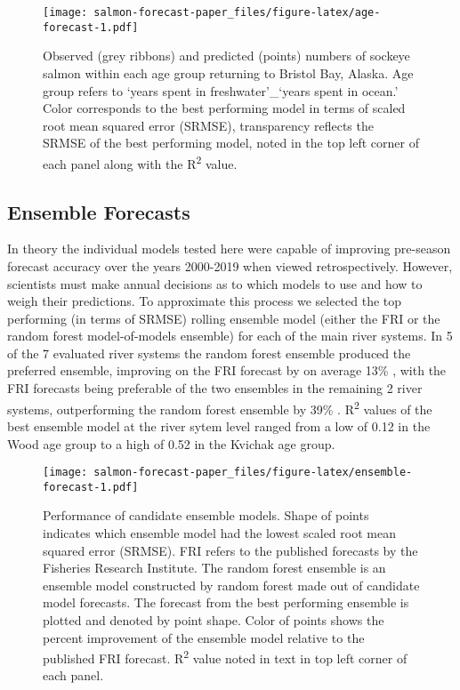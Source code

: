 \documentclass[
]{article}
\begin{document}
\begin{figure}
\centering
\texttt{[image: salmon-forecast-paper\_files/figure-latex/age-forecast-1.pdf]}
\caption{\label{fig:age-forecast}Observed (grey ribbons) and predicted (points) numbers of sockeye salmon within each age group returning to Bristol Bay, Alaska. Age group refers to `years spent in freshwater'\_`years spent in ocean.' Color corresponds to the best performing model in terms of scaled root mean squared error (SRMSE), transparency reflects the SRMSE of the best performing model, noted in the top left corner of each panel along with the R\textsuperscript{2} value.}
\end{figure}

\hypertarget{ensemble-forecasts}{%
\subsection{Ensemble Forecasts}\label{ensemble-forecasts}}

In theory the individual models tested here were capable of improving pre-season forecast accuracy over the years 2000-2019 when viewed retrospectively. However, scientists must make annual decisions as to which models to use and how to weigh their predictions. To approximate this process we selected the top performing (in terms of SRMSE) rolling ensemble model (either the FRI or the random forest model-of-models ensemble) for each of the main river systems. In 5 of the 7 evaluated river systems the random forest ensemble produced the preferred ensemble, improving on the FRI forecast by on average 13\% , with the FRI forecasts being preferable of the two ensembles in the remaining 2 river systems, outperforming the random forest ensemble by 39\% . R\textsuperscript{2} values of the best ensemble model at the river sytem level ranged from a low of 0.12 in the Wood age group to a high of 0.52 in the Kvichak age group.

\begin{figure}
\centering
\texttt{[image: salmon-forecast-paper\_files/figure-latex/ensemble-forecast-1.pdf]}
\caption{\label{fig:ensemble-forecast}Performance of candidate ensemble models. Shape of points indicates which ensemble model had the lowest scaled root mean squared error (SRMSE). FRI refers to the published forecasts by the Fisheries Research Institute. The random forest ensemble is an ensemble model constructed by random forest made out of candidate model forecasts. The forecast from the best performing ensemble is plotted and denoted by point shape. Color of points shows the percent improvement of the ensemble model relative to the published FRI forecast. R\textsuperscript{2} value noted in text in top left corner of each panel.}
\end{figure}
\end{document}
